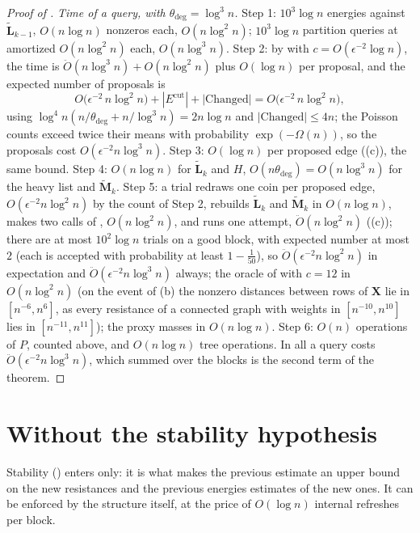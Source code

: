 \documentclass[11pt]{article}
\theoremstyle{remark}
\newcommand{\LL}{\mathbf L}
\newcommand{\LLtil}{{\widetilde{\LL}}}
\newcommand{\MM}{\mathbf M}
\newcommand{\MMtil}{{\widetilde{\MM}}}
\newcommand{\XX}{\mathbf X}
\newcommand{\dheavy}{\theta_{\deg}}
\newcommand{\Ecut}{E^{\mathrm{cut}}}
\newcommand{\Odouble}{\ddot{O}}
\begin{document}
\begin{proof}[Proof of ]
\emph{Time of a query, with $\dheavy=\log^{3}n$.}
Step 1: $10^{3}\log n$ energies against $\LLtil_{k-1}$, $O(n\log n)$ nonzeros
each, $O(n\log^{2}n)$; $10^{3}\log n$ partition queries at amortized
$O(n\log^{2}n)$ each, $O(n\log^{3}n)$.
Step 2: by  with $c=O(\epsilon^{-2}\log n)$, the time is
$\Odouble(n\log^{3}n)+O(n\log^{2}n)$ plus $O(\log n)$ per proposal, and the
expected number of proposals is
\[
O\bigl(\epsilon^{-2}\,n\log^{2}n\bigr)+|\Ecut|+|\mathrm{Changed}|
=O\bigl(\epsilon^{-2}\,n\log^{2}n\bigr),
\]
using $\log^{4}n(n/\dheavy+n/\log^{3}n)=2n\log n$ and $|\mathrm{Changed}|\le4n$;
the Poisson counts exceed twice their means with probability
$\exp(-\Omega(n))$, so the proposals cost $O(\epsilon^{-2}n\log^{3}n)$.
Step 3: $O(\log n)$ per proposed edge ((c)), the same bound.
Step 4: $O(n\log n)$ for $\LLtil_k$ and $H$, $O(n\dheavy)=O(n\log^{3}n)$ for
the heavy list and $\MMtil_k$.
Step 5: a trial redraws one coin per proposed edge, $O(\epsilon^{-2}n\log^{2}n)$
by the count of Step 2, rebuilds $\LLtil_k$ and $\MMtil_k$ in $O(n\log n)$,
makes two calls of , $O(n\log^{2}n)$, and runs one attempt,
$\Odouble(n\log^{2}n)$ ((c)); there are at most $10^{2}\log n$
trials on a good block, with expected number at most $2$ (each is accepted
with probability at least $1-\frac1{50}$), so $\Odouble(\epsilon^{-2}n\log^{2}n)$ in
expectation and $\Odouble(\epsilon^{-2}n\log^{3}n)$ always; the oracle of  with $c=12$ in
$O(n\log^{2}n)$ (on the event of (b) the nonzero distances
between rows of $\XX$ lie in $[n^{-6},n^{6}]$, as every resistance of a
connected graph with weights in $[n^{-10},n^{10}]$ lies in $[n^{-11},n^{11}]$);
the proxy masses in $O(n\log n)$.
Step 6: $O(n)$ operations of $P$, counted above, and $O(n\log n)$ tree
operations.
In all a query costs $\Odouble(\epsilon^{-2}n\log^{3}n)$, which summed over
the blocks is the second term of the theorem.
\end{proof}

\section{Without the stability hypothesis}\label{sec:general}

Stability () enters  only: it is what
makes the previous estimate an upper bound on the new resistances and the previous
energies estimates of the new ones.
It can be enforced by the structure itself, at the price of $O(\log n)$
internal refreshes per block.
\end{document}
